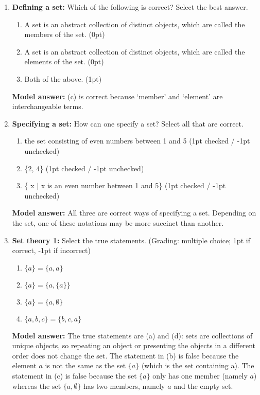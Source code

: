 \documentclass[a4,11pt]{article}
\begin{document}
\begin{enumerate}[leftmargin = 12pt]

\item {\bf Defining a set:} Which of the following is correct? Select the best answer.

      \begin{enumerate}[noitemsep]
        \item A set is an abstract collection of distinct objects, which are called the members of the set. (0pt)
	\item A set is an abstract collection of distinct objects, which are called the elements of the set. (0pt)
        \item Both of the above. (1pt)
	\end{enumerate}
	
{\bf Model answer:} (c) is correct because `member' and `element' are interchangeable terms.

\item {\bf Specifying a set:} How can one specify a set? Select all that are correct.

      \begin{enumerate}[noitemsep]
        \item the set consisting of even numbers between 1 and 5 (1pt checked / -1pt unchecked)
	\item \{2, 4\} (1pt checked / -1pt unchecked)
        \item \{ x $|$ x is an even number between 1 and 5\} (1pt checked / -1pt unchecked)
	\end{enumerate}	

{\bf Model answer:} All three are correct ways of specifying a set. Depending on the set, one of these notations may be more succinct than another.

\item {\bf Set theory 1:} Select the true statements. (Grading: multiple choice; 1pt if correct, -1pt if incorrect)

      \begin{enumerate}[noitemsep]
        \item $\{a\} = \{a, a\}$
        \item $\{a\} = \{a, \{a\}\}$
         \item $\{a\} = \{a, \emptyset\}$
         \item $\{a, b, c\} = \{b, c, a\}$
       \end{enumerate}

 {\bf Model answer:} The true statements are (a) and (d): sets are collections of unique objects, so repeating an object or presenting the objects in a different order does not change the set. The statement in (b) is false because the element $a$ is not the same as the set $\{a\}$ (which is the set containing a). The statement in (c) is false because the set $\{a\}$ only has one member (namely $a$) whereas the set $\{a, \emptyset\}$ has two members, namely $a$ and the empty set.
         

\end{enumerate}
\end{document}
